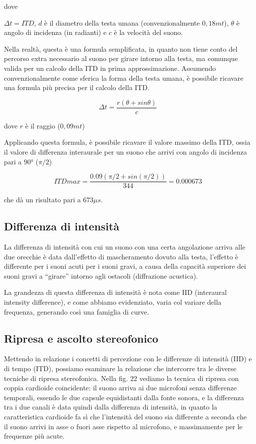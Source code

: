 dove

$\Delta t = ITD$, $d$ è il diametro della testa umana (convenzionalmente $0,18mt$),
$\theta$ è angolo di incidenza (in radianti) e $c$ è la velocità del suono.

Nella realtà, questa è una formula semplificata, in quanto non tiene conto del
percorso extra necessario al suono per girare intorno alla testa, ma comunque
valida per un calcolo della ITD in prima approssimazione. Assumendo
convenzionalmente come sferica la forma della testa umana, è possibile ricavare
una formula più precisa per il calcolo della ITD.

\begin{equation}
\Delta t = \frac{r (\theta + sin\theta)}{c}
\end{equation}

dove $r$ è il raggio ($0,09mt$)

Applicando questa formula, è possibile ricavare il valore massimo della ITD,
ossia il valore di differenza interaurale per un suono che arrivi con angolo
di incidenza pari a $90°$ ($\pi/2$)

\begin{equation}
ITDmax = \frac{0.09 (\pi/2 + sin(\pi/2))}{344} = 0.000673
\end{equation}

che dà un risultato pari a $673μs$.

\subsection{Differenza di intensità}

La differenza di intensità con cui un suono con una certa angolazione arriva
alle due orecchie è data dall’effetto di mascheramento dovuto alla testa,
l’effetto è differente per i suoni acuti
per i suoni gravi, a causa della capacità superiore dei suoni gravi a “girare”
intorno agli ostacoli (diffrazione acustica).

La grandezza di questa differenza di intensità è nota come IID (interaural
intensity difference), e come abbiamo evidenziato, varia col variare della
frequenza, generando così una famiglia di curve.

\subsection{Ripresa e ascolto stereofonico}

Mettendo in relazione i concetti di percezione con le differenze di intensità
(IID) e di tempo (ITD), possiamo esaminare la relazione che intercorre tra le
diverse tecniche di ripresa stereofonica. Nella fig. 22 vediamo la tecnica di
ripresa con coppia cardioide coincidente: il suono arriva ai due microfoni
senza differenze temporali, essendo le due capsule equidistanti dalla fonte
sonora, e la differenza tra i due canali è data quindi dalla differenza di
intensità, in quanto la caratteristica cardioide fa sì che l’intensità del suono
sia differente a seconda che il suono arrivi in asse o fuori asse rispetto al
microfono, e massimamente per le frequenze più acute.

